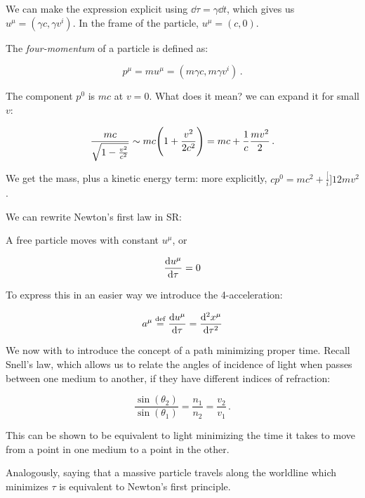 \documentclass[main.tex]{subfiles}
\begin{document}
We can make the expression explicit using \(\dd{\tau} = \gamma \dd{t}\), which gives us \(u^{\mu} = (\gamma c, \gamma v^{i})\).
In the frame of the particle, \(u^{\mu} = (c, 0)\).   

The \emph{four-momentum} of a particle is defined as: 

\begin{equation}
  p^{\mu} = m u^{\mu} = (m \gamma c, m \gamma v^{i})\,.
\end{equation}

The component \(p^{0}\) is \(mc\) at \(v=0\). What does it mean? we can expand it for small \(v\):

\begin{equation}
  \frac{mc}{\sqrt{1 - \frac{v^{2}}{c^{2}}}} \sim
  mc \qty(1 + \frac{v^{2}}{2 c^{2} } )
  = mc + \frac{1}{c} \frac{mv^{2}}{2}\,.
\end{equation}

We get the mass, plus a kinetic energy term: more explicitly, \(cp^0 = mc^{2} + \frac[i]{1}{2} m v^{2}\).

We can rewrite Newton's first law in SR:

\begin{proposition}[Newton I]
A free particle moves with constant \(u^{\mu}\), or 

\begin{equation}
  \dv{u^{\mu}}{\tau} = 0 
\end{equation}
\end{proposition}

To express this in an easier way we introduce the 4-acceleration:

\begin{equation}
  a^{\mu} \stackrel{\text{def}}{=} \dv{u^{\mu}}{\tau} = \dv[2]{x^{\mu}}{\tau}
\end{equation}

We now with to introduce the concept of a path minimizing proper time. Recall Snell's law, which allows us to relate the angles of incidence of light when passes between one medium to another, if they have different indices of refraction:

\begin{equation}
  \frac{\sin(\theta_{2})}{\sin(\theta_{1})} = \frac{n_1}{n_2 } = \frac{v_2}{v_1 }\,.
\end{equation}

This can be shown to be equivalent to light minimizing the time it takes to move from a point in one medium to a point in the other.

Analogously, saying that a massive particle travels along the worldline which minimizes \(\tau\) is equivalent to Newton's first principle.
\end{document}
